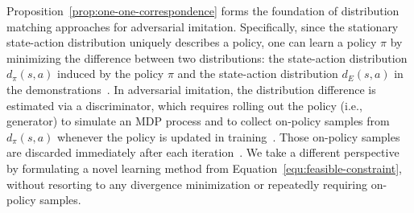 \documentclass[letterpaper]{article} %
\begin{document}
Proposition~\ref{prop:one-one-correspondence} forms the foundation of distribution matching approaches for adversarial imitation.
Specifically, since the stationary state-action distribution uniquely describes a policy,
one can learn a policy $\pi$ by minimizing the difference between two distributions: the state-action distribution $d_{\pi}(s, a)$ induced by the policy $\pi$ and the state-action distribution $d_{E}(s, a)$ in the demonstrations~\cite{ho2016generative,kostrikov2018discriminator,ke2019imitation,ghasemipour2020divergence}.
In adversarial imitation, the distribution difference is estimated via a discriminator,
which requires rolling out the policy (i.e., generator) to simulate an MDP process and to collect on-policy samples from $d_{\pi}(s, a)$ whenever the policy is updated in training~\cite{ho2016generative}.
Those on-policy samples are discarded immediately after each iteration~\cite{kostrikov2018discriminator,kostrikov2019imitation}.
We take a different perspective by formulating a novel learning method from Equation~\eqref{equ:feasible-constraint},
without resorting to any divergence minimization or repeatedly requiring on-policy samples.
\end{document}
